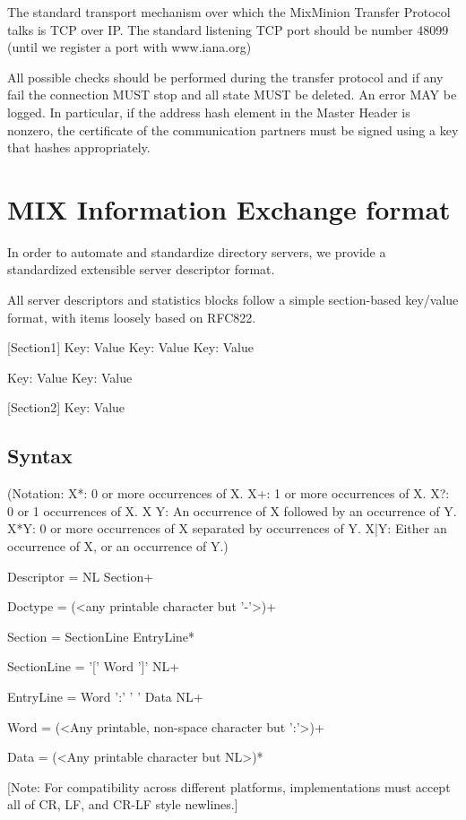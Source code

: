 The standard transport mechanism over which the MixMinion Transfer
Protocol talks is TCP over IP. The standard listening TCP port should be 
number 48099 (until we register a port with www.iana.org)

All possible checks should be performed during the transfer protocol
and if any fail the connection MUST stop and all state MUST
be deleted. An error MAY be logged. In particular, if the address
hash element in the Master Header is nonzero, the certificate of
the communication partners must be signed using a key that hashes
appropriately.

\section{MIX Information Exchange format}

In order to automate and standardize directory servers, we provide 
a standardized extensible server descriptor format.

All server descriptors and statistics blocks follow a simple
section-based key/value format, with items loosely based on RFC822.

[Section1]
Key: Value
Key: Value
Key: Value

Key: Value
Key: Value

[Section2]
Key: Value

\subsection{Syntax}

(Notation:  X*: 0 or more occurrences of X.
            X+: 1 or more occurrences of X.
	    X?: 0 or 1 occurrences of X.
            X Y: An occurrence of X followed by an occurrence of Y.
	    X*{Y}: 0 or more occurrences of X separated by occurrences
                  of Y.
            X|Y: Either an occurrence of X, or an occurrence of Y.)

Descriptor = NL Section+ 

Doctype = (<any printable character but '-'>)+

Section = SectionLine EntryLine*

SectionLine = '[' Word ']' NL+

EntryLine = Word ':' ' ' Data NL+

Word = (<Any printable, non-space character but ':'>)+

Data = (<Any printable character but NL>)*

[Note: For compatibility across different platforms, implementations must
  accept all of CR, LF, and CR-LF style newlines.]

